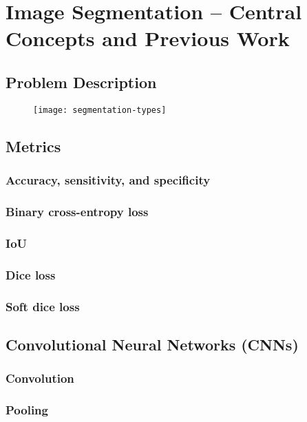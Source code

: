 \section{Image Segmentation -- Central Concepts and Previous Work}



\subsection{Problem Description}
\label{sec:segmentation-description}

\begin{figure}[htb]
  \texttt{[image: segmentation-types]}
\end{figure}

\subsection{Metrics}
\label{sec:segmentation-metrics}
  \subsubsection{Accuracy, sensitivity, and specificity}
  \subsubsection{Binary cross-entropy loss}
  \subsubsection{IoU}
  \subsubsection{Dice loss}
  \subsubsection{Soft dice loss}

\subsection{Convolutional Neural Networks (CNNs)}
\label{sec:cnn}
  \subsubsection{Convolution}
  \subsubsection{Pooling}
